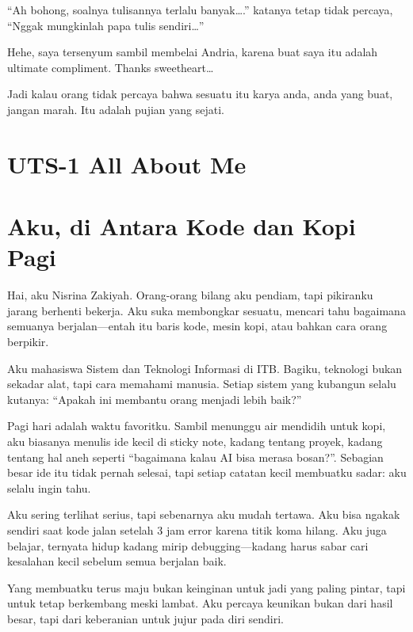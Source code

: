 \documentclass[
  letterpaper,
  DIV=11,
  numbers=noendperiod]{scrreprt}
\begin{document}
``Ah bohong, soalnya tulisannya terlalu banyak\ldots.'' katanya tetap
tidak percaya, ``Nggak mungkinlah papa tulis sendiri\ldots{}''

Hehe, saya tersenyum sambil membelai Andria, karena buat saya itu adalah
ultimate compliment. Thanks sweetheart\ldots{}

Jadi kalau orang tidak percaya bahwa sesuatu itu karya anda, anda yang
buat, jangan marah. Itu adalah pujian yang sejati.


\chapter{UTS-1 All About Me}\label{uts-1-all-about-me}


\chapter{Aku, di Antara Kode dan Kopi
Pagi}\label{aku-di-antara-kode-dan-kopi-pagi}

Hai, aku Nisrina Zakiyah. Orang-orang bilang aku pendiam, tapi pikiranku
jarang berhenti bekerja. Aku suka membongkar sesuatu, mencari tahu
bagaimana semuanya berjalan---entah itu baris kode, mesin kopi, atau
bahkan cara orang berpikir.

Aku mahasiswa Sistem dan Teknologi Informasi di ITB. Bagiku, teknologi
bukan sekadar alat, tapi cara memahami manusia. Setiap sistem yang
kubangun selalu kutanya: ``Apakah ini membantu orang menjadi lebih
baik?''

Pagi hari adalah waktu favoritku. Sambil menunggu air mendidih untuk
kopi, aku biasanya menulis ide kecil di sticky note, kadang tentang
proyek, kadang tentang hal aneh seperti ``bagaimana kalau AI bisa merasa
bosan?''. Sebagian besar ide itu tidak pernah selesai, tapi setiap
catatan kecil membuatku sadar: aku selalu ingin tahu.

Aku sering terlihat serius, tapi sebenarnya aku mudah tertawa. Aku bisa
ngakak sendiri saat kode jalan setelah 3 jam error karena titik koma
hilang. Aku juga belajar, ternyata hidup kadang mirip debugging---kadang
harus sabar cari kesalahan kecil sebelum semua berjalan baik.

Yang membuatku terus maju bukan keinginan untuk jadi yang paling pintar,
tapi untuk tetap berkembang meski lambat. Aku percaya keunikan bukan
dari hasil besar, tapi dari keberanian untuk jujur pada diri sendiri.
\end{document}
